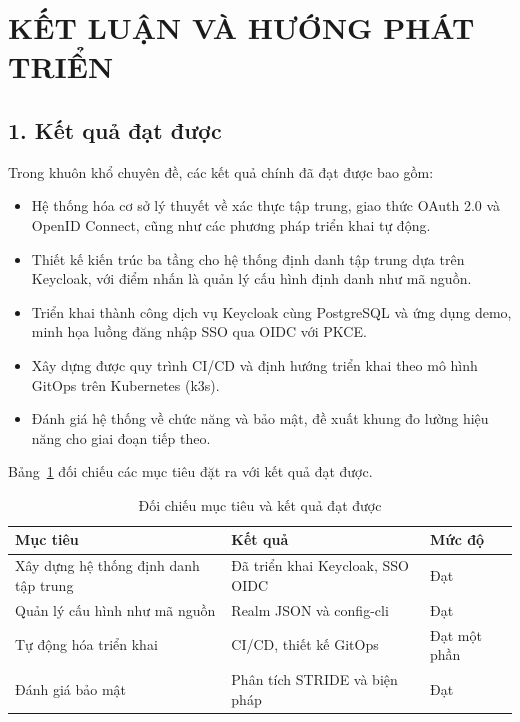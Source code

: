 \chapter*{KẾT LUẬN VÀ HƯỚNG PHÁT TRIỂN}

\section*{1. Kết quả đạt được}

Trong khuôn khổ chuyên đề, các kết quả chính đã đạt được bao gồm:

\begin{itemize}
  \item Hệ thống hóa cơ sở lý thuyết về xác thực tập trung, giao thức OAuth 2.0
  và OpenID Connect, cũng như các phương pháp triển khai tự động.
  \item Thiết kế kiến trúc ba tầng cho hệ thống định danh tập trung dựa trên
  Keycloak, với điểm nhấn là quản lý cấu hình định danh như mã nguồn.
  \item Triển khai thành công dịch vụ Keycloak cùng PostgreSQL và ứng dụng
  demo, minh họa luồng đăng nhập SSO qua OIDC với PKCE.
  \item Xây dựng được quy trình CI/CD và định hướng triển khai theo mô hình
  GitOps trên Kubernetes (k3s).
  \item Đánh giá hệ thống về chức năng và bảo mật, đề xuất khung đo lường hiệu
  năng cho giai đoạn tiếp theo.
\end{itemize}

Bảng~\ref{tab:muctieu} đối chiếu các mục tiêu đặt ra với kết quả đạt được.

\begin{table}[htbp]
\centering
\caption{Đối chiếu mục tiêu và kết quả đạt được}
\label{tab:muctieu}
\small
\begin{tabular}{p{6cm} p{4.2cm} p{2.6cm}}
\toprule
\textbf{Mục tiêu} & \textbf{Kết quả} & \textbf{Mức độ}\\
\midrule
Xây dựng hệ thống định danh tập trung & Đã triển khai Keycloak, SSO OIDC & Đạt\\
Quản lý cấu hình như mã nguồn & Realm JSON và config-cli & Đạt\\
Tự động hóa triển khai & CI/CD, thiết kế GitOps & Đạt một phần\\
Đánh giá bảo mật & Phân tích STRIDE và biện pháp & Đạt\\
\bottomrule
\end{tabular}
\end{table}

